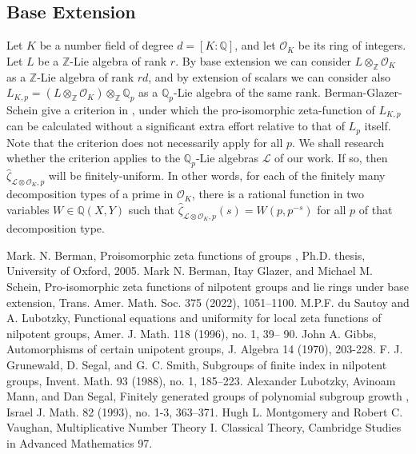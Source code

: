 \documentclass[12pt]{article}
\begin{document}
\subsection{Base Extension}
Let $K$ be a number field of degree $d=[K:\mathbb{Q}]$, and let $\mathcal{O}_K$ be its ring of integers. Let $L$ be a $\mathbb{Z}$-Lie algebra of rank $r$. By base extension we can consider $L\otimes_{\mathbb{Z}}\mathcal{O}_K$ as a $\mathbb{Z}$-Lie algebra of rank $rd$, and by extension of scalars we can consider also $L_{K,p}=(L\otimes_{\mathbb{Z}}\mathcal{O}_K)\otimes_{\mathbb{Z}}\mathbb{Q}_p$ as a $\mathbb{Q}_p$-Lie algebra of the same rank. Berman-Glazer-Schein give a criterion in \cite{BermanGlazerSchein}, under which the pro-isomorphic zeta-function of $L_{K,p}$ can be calculated without a significant extra effort relative to that of $L_p$ itself. Note that the criterion does not necessarily apply for all $p$. We shall research whether the criterion applies to the $\mathbb{Q}_p$-Lie algebras $\mathcal{L}$ of our work. If so, then $\hat\zeta_{\mathcal{L}\otimes\mathcal{O}_K,p}$ will be finitely-uniform. In other words, for each of the finitely many decomposition types of a prime in $\mathcal{O}_K$, there is a rational function in two variables $W\in\mathbb{Q}(X,Y)$ such that $\hat\zeta_{\mathcal{L}\otimes\mathcal{O}_K,p}(s)=W(p,p^{-s})$ for all $p$ of that decomposition type.
\begin{thebibliography}{2}
 Mark. N. Berman,
Proisomorphic zeta functions of groups
, Ph.D. thesis, University of Oxford,
2005.
 Mark N. Berman, Itay Glazer, and Michael M. Schein, Pro-isomorphic zeta functions of nilpotent groups and lie rings under base extension, Trans. Amer. Math. Soc. 375 (2022), 1051–1100.
 M.P.F. du Sautoy and A. Lubotzky, Functional equations and uniformity for
local zeta functions of nilpotent groups, Amer. J. Math. 118 (1996), no. 1, 39–
90.
 John A. Gibbs, Automorphisms of certain unipotent groups, J. Algebra 14 (1970), 203-228.
 F. J. Grunewald, D. Segal, and G. C. Smith, Subgroups of finite index in nilpotent groups,
Invent. Math. 93 (1988), no. 1, 185–223.
 Alexander Lubotzky, Avinoam Mann, and Dan Segal,
Finitely generated groups of polynomial
subgroup growth
, Israel J. Math.
82
(1993), no. 1-3, 363–371.
 Hugh L. Montgomery and Robert C. Vaughan, Multiplicative Number Theory I. Classical Theory, Cambridge Studies in Advanced Mathematics 97.
\end{thebibliography}
\end{document}
